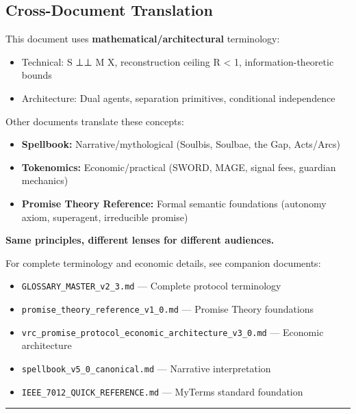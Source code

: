 \documentclass[
]{article}
\begin{document}
\subsection{Cross-Document
Translation}\label{cross-document-translation}

This document uses \textbf{mathematical/architectural} terminology:

\begin{itemize}
\item
  Technical: S ⊥⊥ M \textbar{} X, reconstruction ceiling R \textless{}
  1, information-theoretic bounds
\item
  Architecture: Dual agents, separation primitives, conditional
  independence
\end{itemize}

Other documents translate these concepts:

\begin{itemize}
\item
  \textbf{Spellbook:} Narrative/mythological (Soulbis, Soulbae, the Gap,
  Acts/Arcs)
\item
  \textbf{Tokenomics:} Economic/practical (SWORD, MAGE, signal fees,
  guardian mechanics)
\item
  \textbf{Promise Theory Reference:} Formal semantic foundations
  (autonomy axiom, superagent, irreducible promise)
\end{itemize}

\textbf{Same principles, different lenses for different audiences.}

For complete terminology and economic details, see companion documents:

\begin{itemize}
\item
  \texttt{GLOSSARY\_MASTER\_v2\_3.md} --- Complete protocol terminology
\item
  \texttt{promise\_theory\_reference\_v1\_0.md} --- Promise Theory
  foundations
\item
  \texttt{vrc\_promise\_protocol\_economic\_architecture\_v3\_0.md} ---
  Economic architecture
\item
  \texttt{spellbook\_v5\_0\_canonical.md} --- Narrative interpretation
\item
  \texttt{IEEE\_7012\_QUICK\_REFERENCE.md} --- MyTerms standard
  foundation
\end{itemize}

\begin{center}\rule{0.5\linewidth}{0.5pt}\end{center}
\end{document}

